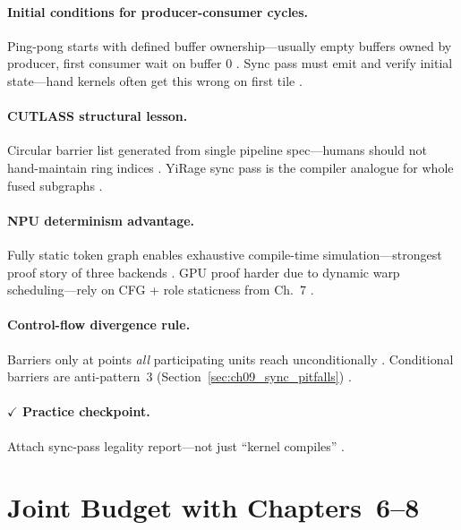 \paragraph{Initial conditions for producer-consumer cycles.}
Ping-pong starts with defined buffer ownership---usually empty buffers owned by producer, first consumer wait on buffer 0 \citep{semianalysis2024tma,dao2022flashattention,shah2024flashattention3}.
Sync pass must emit and verify initial state---hand kernels often get this wrong on first tile \citep{yirage2026,chen2020compilerbasedhardw,taxbreak2026}.

\paragraph{CUTLASS structural lesson.}
Circular barrier list generated from single pipeline spec---humans should not hand-maintain ring indices \citep{shah2024flashattention3,wu2024mirage}.
YiRage sync pass is the compiler analogue for whole fused subgraphs \citep{yirage2026,mpk2025,chen2020compilerbasedhardw}.

\paragraph{NPU determinism advantage.}
Fully static token graph enables exhaustive compile-time simulation---strongest proof story of three backends \citep{amd2024xdna,amd2024aie,yirage2026}.
GPU proof harder due to dynamic warp scheduling---rely on CFG + role staticness from Ch.~7 \citep{shah2024flashattention3,nvidia2022hopper,patel2025llminference}.

\paragraph{Control-flow divergence rule.}
Barriers only at points \emph{all} participating units reach unconditionally \citep{nvidia2022hopper,shah2024flashattention3}.
Conditional barriers are anti-pattern~3 (Section~\ref{sec:ch09_sync_pitfalls}) \citep{yirage2026,chen2020compilerbasedhardw}.

\paragraph{$\checkmark$ Practice checkpoint.}
Attach sync-pass legality report---not just ``kernel compiles'' \citep{yirage2026,wu2024mirage,shah2024flashattention3}.

\section{Joint Budget with Chapters~6--8}
\label{sec:ch09_joint_budget}


